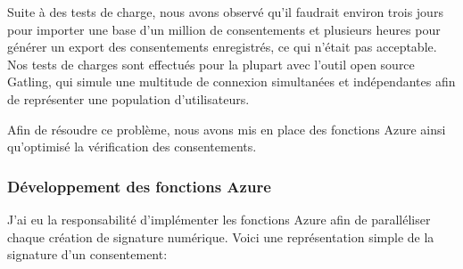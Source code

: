 \documentclass[12pt, a4paper]{report}
\begin{document}
Suite à des tests de charge, nous avons observé qu'il faudrait environ trois jours pour importer une base d'un million de consentements et plusieurs heures pour générer un export des consentements enregistrés, ce qui n'était pas acceptable.\newpage
Nos tests de charges sont effectués pour la plupart avec l'outil open source Gatling, qui simule une multitude de connexion simultanées et indépendantes afin de représenter une population d'utilisateurs.\newline

Afin de résoudre ce problème, nous avons mis en place des fonctions Azure ainsi qu'optimisé la vérification des consentements.

\subsubsection{Développement des fonctions Azure}
J'ai eu la responsabilité d'implémenter les fonctions Azure afin de paralléliser chaque création de signature numérique.\newline
Voici une représentation simple de la signature d'un consentement:
\end{document}
